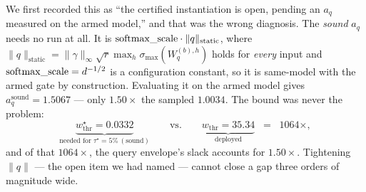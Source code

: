 \documentclass[11pt]{article}
\renewcommand{\_}{\WCorigunderscore\allowbreak}
\begin{document}
We first recorded this as ``the certified instantiation is open, pending
an $a_q$ measured on the armed model,'' and that was the wrong diagnosis.
The \emph{sound} $a_q$ needs no run at all. It is
$\mathrm{softmax\_scale}\cdot\|q\|_{\mathrm{static}}$, where
$\|q\|_{\mathrm{static}}=\|\gamma\|_\infty\sqrt{r}\max_h\sigma_{\max}
(W_q^{(b),h})$ holds for \emph{every} input and
$\mathrm{softmax\_scale}=d^{-1/2}$ is a configuration constant, so it is
same-model with the armed gate by construction. Evaluating it on the
armed model gives $a_q^{\mathrm{sound}}=1.5067$ --- only
$1.50\times$ the sampled $1.0034$. The bound was never the problem:
\begin{equation}
\underbrace{w_{\mathrm{thr}}^\star=0.0332}
      _{\text{needed for }\tau^\star=5\%\ (\text{sound})}
\qquad\text{vs.}\qquad
\underbrace{w_{\mathrm{thr}}=35.34}_{\text{deployed}}
\;\;=\;\;1064\times ,
\label{eq:gategap}
\end{equation}
and of that $1064\times$, the query envelope's slack accounts for
$1.50\times$. Tightening $\|q\|$ --- the open item we had named --- cannot
close a gap three orders of magnitude wide.
\end{document}
